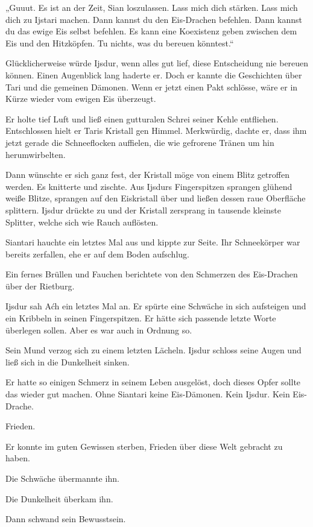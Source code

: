 „Guuut. Es ist an der Zeit, Sian loszulassen. Lass mich dich stärken. Lass mich dich zu Ijstari machen. Dann kannst du den Eis-Drachen befehlen. Dann kannst du das ewige Eis selbst befehlen. Es kann eine Koexistenz geben zwischen dem Eis und den Hitzköpfen. Tu nichts, was du bereuen könntest.“

Glücklicherweise würde Ijsdur, wenn alles gut lief, diese Entscheidung nie bereuen können. Einen Augenblick lang haderte er. Doch er kannte die Geschichten über Tari und die gemeinen Dämonen. Wenn er jetzt einen Pakt schlösse, wäre er in Kürze wieder vom ewigen Eis überzeugt.

Er holte tief Luft und ließ einen gutturalen Schrei seiner Kehle entfliehen. Entschlossen hielt er Taris Kristall gen Himmel. Merkwürdig, dachte er, dass ihm jetzt gerade die Schneeflocken auffielen, die wie gefrorene Tränen um hin herumwirbelten.

Dann wünschte er sich ganz fest, der Kristall möge von einem Blitz getroffen werden. Es knitterte und zischte. Aus Ijsdurs Fingerspitzen sprangen glühend weiße Blitze, sprangen auf den Eiskristall über und ließen dessen raue Oberfläche splittern. Ijsdur drückte zu und der Kristall zersprang in tausende kleinste Splitter, welche sich wie Rauch auflösten.

Siantari hauchte ein letztes Mal aus und kippte zur Seite. Ihr Schneekörper war bereits zerfallen, ehe er auf dem Boden aufschlug.

Ein fernes Brüllen und Fauchen berichtete von den Schmerzen des Eis-Drachen über der Rietburg.

Ijsdur sah Aćh ein letztes Mal an. Er spürte eine Schwäche in sich aufsteigen und ein Kribbeln in seinen Fingerspitzen. Er hätte sich passende letzte Worte überlegen sollen. Aber es war auch in Ordnung so.

Sein Mund verzog sich zu einem letzten Lächeln. Ijsdur schloss seine Augen und ließ sich in die Dunkelheit sinken.

Er hatte so einigen Schmerz in seinem Leben ausgelöst, doch dieses Opfer sollte das wieder gut machen. Ohne Siantari keine Eis-Dämonen. Kein Ijsdur. Kein Eis-Drache.

Frieden.

Er konnte im guten Gewissen sterben, Frieden über diese Welt gebracht zu haben.

Die Schwäche übermannte ihn.

Die Dunkelheit überkam ihn.

Dann schwand sein Bewusstsein.



